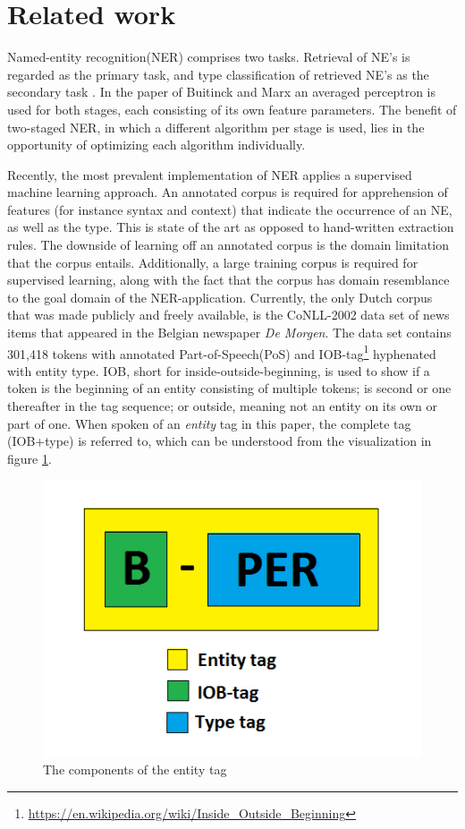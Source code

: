 \section{Related work} \label{sec:rel}
Named-entity recognition(NER) comprises two tasks. Retrieval of NE's is regarded as the primary task, and type classification of retrieved NE's as the secondary task \cite{buitinck2012two}. In the paper of Buitinck and Marx an averaged perceptron is used for both stages, each consisting of its own feature parameters. The benefit of two-staged NER, in which a different algorithm per stage is used, lies in the opportunity of optimizing each algorithm individually.  

Recently, the most prevalent implementation of NER applies a supervised machine learning approach. An annotated corpus is required for apprehension of features (for instance syntax and context) that indicate the occurrence of an NE, as well as the type. This is state of the art as opposed to hand-written extraction rules. The downside of learning off an annotated corpus is the domain limitation that the corpus entails. Additionally, a large training corpus is required for supervised learning, along with the fact that the corpus has domain resemblance to the goal domain of the NER-application. Currently, the only Dutch corpus that was made publicly and freely available, is the CoNLL-2002 data set of news items that appeared in the Belgian newspaper \textit{De Morgen}. The data set contains 301,418 tokens with annotated Part-of-Speech(PoS) and IOB-tag\footnote{\url{https://en.wikipedia.org/wiki/Inside_Outside_Beginning}} hyphenated with entity type. IOB, short for inside-outside-beginning, is used to show if a token is the beginning of an entity consisting of multiple tokens; is second or one thereafter in the tag sequence; or outside, meaning not an entity on its own or part of one. When spoken of an \textit{entity} tag in this paper, the complete tag (IOB+type) is referred to, which can be understood from the visualization in figure \ref{fig:iob}.

\begin{figure}
    \centering
    \includegraphics[scale=0.5]{fig/entity_tag}
    \caption{The components of the entity tag}
    \label{fig:iob}
\end{figure}

